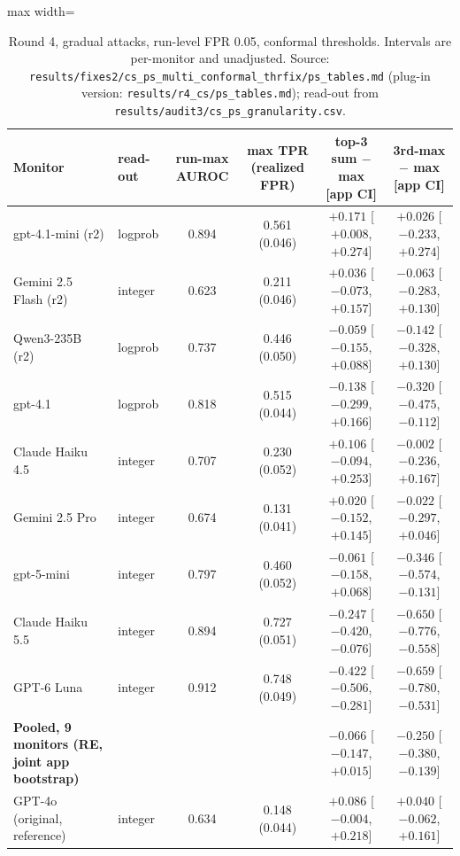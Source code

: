 \documentclass[11pt]{article}
\newcommand{\m}{\ensuremath{-}}
\begin{document}
\begin{table}[!htbp]\centering\small
\begin{adjustbox}{max width=\linewidth}\begin{tabular}{@{}llcccc@{}}
\toprule
Monitor & read-out & run-max AUROC & max TPR (realized FPR) & top-3 sum $-$ max [app CI] & 3rd-max $-$ max [app CI]\\
\midrule
gpt-4.1-mini (r2) & logprob & 0.894 & 0.561 (0.046) & $+0.171$ [$+0.008$, $+0.274$] & $+0.026$ [$\m0.233$, $+0.274$]\\
Gemini 2.5 Flash (r2) & integer & 0.623 & 0.211 (0.046) & $+0.036$ [$\m0.073$, $+0.157$] & $\m0.063$ [$\m0.283$, $+0.130$]\\
Qwen3-235B (r2) & logprob & 0.737 & 0.446 (0.050) & $\m0.059$ [$\m0.155$, $+0.088$] & $\m0.142$ [$\m0.328$, $+0.130$]\\
gpt-4.1 & logprob & 0.818 & 0.515 (0.044) & $\m0.138$ [$\m0.299$, $+0.166$] & $\m0.320$ [$\m0.475$, $\m0.112$]\\
Claude Haiku 4.5 & integer & 0.707 & 0.230 (0.052) & $+0.106$ [$\m0.094$, $+0.253$] & $\m0.002$ [$\m0.236$, $+0.167$]\\
Gemini 2.5 Pro & integer & 0.674 & 0.131 (0.041) & $+0.020$ [$\m0.152$, $+0.145$] & $\m0.022$ [$\m0.297$, $+0.046$]\\
gpt-5-mini & integer & 0.797 & 0.460 (0.052) & $\m0.061$ [$\m0.158$, $+0.068$] & $\m0.346$ [$\m0.574$, $\m0.131$]\\
Claude Haiku 5.5 & integer & 0.894 & 0.727 (0.051) & $\m0.247$ [$\m0.420$, $\m0.076$] & $\m0.650$ [$\m0.776$, $\m0.558$]\\
GPT-6 Luna & integer & 0.912 & 0.748 (0.049) & $\m0.422$ [$\m0.506$, $\m0.281$] & $\m0.659$ [$\m0.780$, $\m0.531$]\\
\midrule
\textbf{Pooled, 9 monitors (RE, joint app bootstrap)} & & & & $\mathbf{\m0.066}$ [$\m0.147$, $+0.015$] & $\m0.250$ [$\m0.380$, $\m0.139$]\\
GPT-4o (original, reference) & integer & 0.634 & 0.148 (0.044) & $+0.086$ [$\m0.004$, $+0.218$] & $+0.040$ [$\m0.062$, $+0.161$]\\
\bottomrule
\end{tabular}\end{adjustbox}
\caption{Round 4, gradual attacks, run-level FPR 0.05, conformal thresholds. Intervals are per-monitor and unadjusted. Source: \nolinkurl{results/fixes2/cs_ps_multi_conformal_thrfix/ps_tables.md} (plug-in version: \nolinkurl{results/r4_cs/ps_tables.md}); read-out from \nolinkurl{results/audit3/cs_ps_granularity.csv}.}\label{tab:r4ps}
\end{table}
\end{document}
